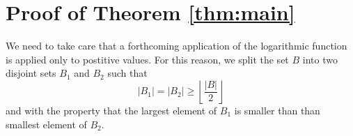 \documentclass[11pt,oneside]{amsart}
\numberwithin{exercise}{subsection}
\begin{document}
\begin{comment}
Here is an attempt at a proof. Label the elements of $X=\{x_1 < \dots < x_n \}$ and $Y=\{x_1 < \dots < y_m \}$ in ascending order. Let us assume without loss of generality that $n \geq m$.

Consider the set of all nearly neighbouring distances
\[
U=\{x_{k+2} - x_k:  1 \leq k \leq n-2 \} \cup \{y_{k+2} - y_k:  1 \leq k \leq y-2 \}
\]
and let $u$ denote the minimal element of $U$. We assume for now that $u=x_{k+2} - x_k$ for some $1 \leq k \leq n-2$. The case when the minimal element of $U$ comes from a difference in $Y$ can be handles similarly, and we will make some further remarks about this at the end of the proof.

For convenience, we label
\[
x:= x_k, \, x'=x_{k+1}, \, x''=x_{k+2}.
\]
These three elements are fixed for the remainder of the proof.

Consider the intervals
\[
(x-y_{2i}, x'-y_{2i}), \,\, 1 \leq i \leq \lfloor m/2 \rfloor. 
\]
These all have length $x'-x$. Also, they are pairwise disjoint. Indeed, suppose for a contradiction that two such intervals overlap.
\end{comment}





\section{Proof of Theorem \ref{thm:main}}

We need to take care that a forthcoming application of the logarithmic function is applied only to postitive values. For this reason, we split the set $B$ into two disjoint sets $B_1$ and $B_2$ such that
\[
|B_1|=|B_2| \geq \left \lfloor \frac{|B|}{2}  \right \rfloor
\]
and with the property that the largest element of $B_1$ is smaller than than smallest element of $B_2$.
\end{document}
